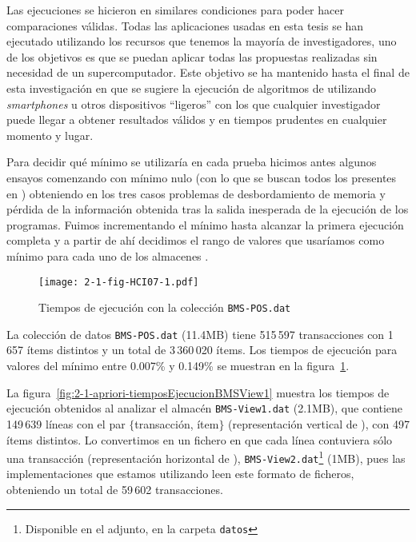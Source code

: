 Las ejecuciones se hicieron en similares condiciones para poder hacer comparaciones válidas. Todas las aplicaciones usadas en esta tesis se han ejecutado utilizando los recursos que tenemos la mayoría de investigadores, uno de los objetivos es que se puedan aplicar todas las propuestas realizadas sin necesidad de un supercomputador. Este objetivo se ha mantenido hasta el final de esta investigación en que se sugiere la ejecución de algoritmos de \dm utilizando \emph{smartphones} u otros dispositivos "`ligeros"' con los que cualquier investigador puede llegar a obtener resultados válidos y en tiempos prudentes en cualquier momento y lugar. %

Para decidir qué \soporte mínimo se utilizaría en cada prueba hicimos antes algunos ensayos comenzando con \soporte mínimo nulo (con lo que se buscan todos los \itemsets presentes en \D) obteniendo en los tres casos problemas de desbordamiento de memoria y pérdida de la información obtenida tras la salida inesperada de la ejecución de los programas. Fuimos incrementando el \soporte mínimo hasta alcanzar la primera ejecución completa y a partir de ahí decidimos el rango de valores que usaríamos como \soporte mínimo para cada uno de los almacenes \D.

\begin{figure}[htbp]
   \centering
   \texttt{[image: 2-1-fig-HCI07-1.pdf]}
   \caption{Tiempos de ejecución con la colección \texttt{BMS-POS.dat}}
\label{fig:2-1-apriori-tiemposEjecucionBMSPOS}
\end{figure}

La colección de datos \texttt{BMS-POS.dat} (11.4MB) tiene 515\,597 transacciones con 1\,657 ítems distintos y un total de 3\,360\,020 ítems. Los tiempos de ejecución para valores del \soporte mínimo entre 0.007\% y 0.149\% se muestran en la figura~\ref{fig:2-1-apriori-tiemposEjecucionBMSPOS}.

La figura~\ref{fig:2-1-apriori-tiemposEjecucionBMSView1} muestra los tiempos de ejecución obtenidos al analizar el almacén \D \texttt{BMS-View1.dat} (2.1MB), que contiene 149\,639 líneas con el par $\{$transacción, ítem$\}$ (representación vertical de \D), con 497 ítems distintos. Lo convertimos en un fichero en que cada línea contuviera sólo una transacción (representación horizontal de \D), \texttt{BMS-View2.dat}\footnote{Disponible en el \dvdAdjunto adjunto, en la carpeta \texttt{datos}} (1MB), pues las implementaciones que estamos utilizando leen este formato de ficheros, obteniendo un total de 59\,602 transacciones.

